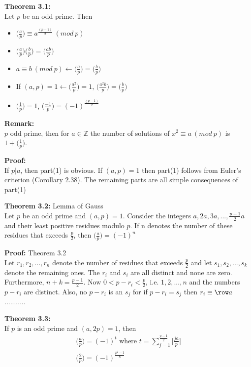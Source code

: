 \documentclass[a4paper]{article}
\begin{document}
\textbf{Theorem 3.1:}\\
Let $p$ be an odd prime. Then
\begin{itemize}
    \item $\big(\frac{a}{p}\big) \equiv a^{\frac{(p-1)}{2}}\ (mod\ p)$
    \item $\big(\frac{a}{p}\big)\big(\frac{b}{p}\big) = \big(\frac{ab}{p}\big)$
    \item $a \equiv b \ (mod\ p) \leftarrow \big(\frac{a}{p}\big)=\big(\frac{b}{p}\big)$
    \item If $(a,p)=1 \leftarrow \big(\frac{a^2}{p}\big) = 1$, $\big(\frac{a^2b}{p}\big)=\big(\frac{b}{p}\big)$
    \item $\big(\frac{1}{p}\big)=1$, $\big(\frac{-1}{p}\big)=(-1)^{\frac{(p-1)}{2}}$
\end{itemize}

\textbf{Remark:}\\
$p$ odd prime, then for $a\in\mathbb{Z}$ the number of solutions of $x^2 \equiv a \ (mod\ p)$ is $1+\big(\frac{1}{p}\big)$.

\textbf{Proof:}\\
If $p|a$, then part(1) is obvious. If $(a,p)=1$ then part(1) follows from Euler's criterion (Corollary 2.38). The remaining parts are all simple consequences of part(1)

\textbf{Theorem 3.2:} Lemma of Gauss\\
Let $p$ be an odd prime and $(a,p)=1$. Consider the integers $a,2a,3a,...,\frac{p-1}{2}a$ and their least positive residues modulo $p$. If n denotes the number of these residues that exceeds $\frac{p}{2}$, then $\big(\frac{a}{p}\big)=(-1)^n$

\textbf{Proof:} Theorem 3.2\\
Let $r_1,r_2,...,r_n$ denote the number of residues that exceeds $\frac{p}{2}$ and let $s_1,s_2,...,s_k$ denote the remaining ones. The $r_i$ and $s_i$ are all distinct and none are zero. Furthermore, $n+k=\frac{p-1}{2}$. Now $0<p-r_i<\frac{p}{2}$, i.e. $1,2,...,n$ and the numbers $p-r_i$ are distinct. Also, no $p-r_i$ is an $s_j$ for if $p-r_i = s_j$ then $r_i \equiv \row a$...........

\textbf{Theorem 3.3:}\\
If $p$ is an odd prime and $(a,2p)=1$, then
\begin{align*}
    \bigg(\frac{a}{p}\bigg) = (-1)^t \text{ where } t=\sum^{\frac{p-1}{2}}_{j=1}\bigg[\frac{ja}{p}\bigg]\\
    \bigg(\frac{2}{p}\bigg) =(-1)^{\frac{p^2-1}{8}}
\end{align*}
\end{document}

